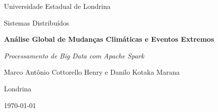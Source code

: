 \begin{titlepage}
  \centering
  \vspace*{2cm}
  {\Large Universidade Estadual de Londrina \par}
  \vspace{0.4cm}
  {\large Sistemas Distribuídos \par}
  \vspace{3cm}
  {\Huge\bfseries Análise Global de Mudanças Climáticas e Eventos Extremos \par}
  \vspace{0.6cm}
  {\Large\itshape Processamento de Big Data com Apache Spark \par}
  \vspace{2cm}
  {\Large Marco Antônio Cottorello Henry e Danilo Kotaka Marana \par}
  \vfill
  {\large Londrina \par}
  {\Large \today \par}
\end{titlepage}
